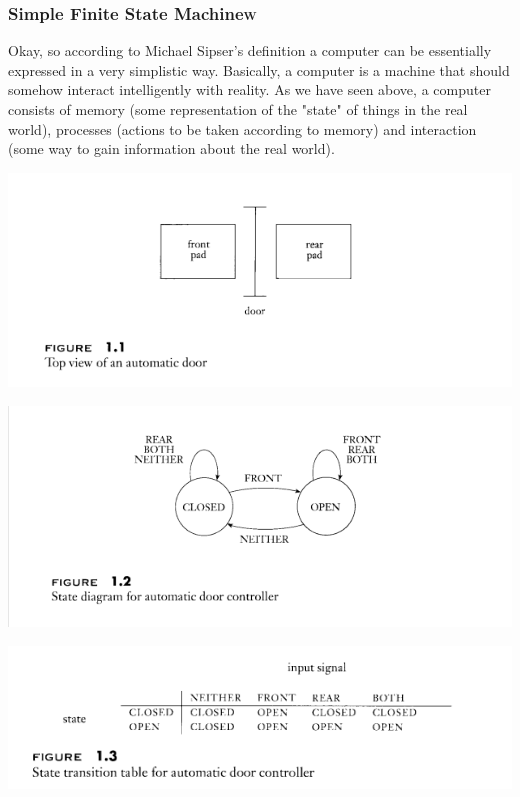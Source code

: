 \documentclass[11pt]{article}
\begin{document}
\subsubsection{Simple Finite State Machine\hfill{}\textsc{w}}
\label{sec:org932b039}

Okay, so according to Michael Sipser's definition a computer can be essentially 
expressed in a very simplistic way. Basically, a computer is a machine that should
somehow interact intelligently with reality. As we have seen above, a computer consists
of memory (some representation of the "state" of things in the real world), 
processes (actions to be taken according to memory) and interaction (some way to gain 
information about the real world). 

\begin{center}
\includegraphics[width=.9\linewidth]{../img/doorSetup.png}
\end{center}


\begin{center}
\includegraphics[width=.9\linewidth]{../img/doorFSM.png}
\end{center}


\begin{center}
\includegraphics[width=.9\linewidth]{../img/stateDiagram.png}
\end{center}
\end{document}
